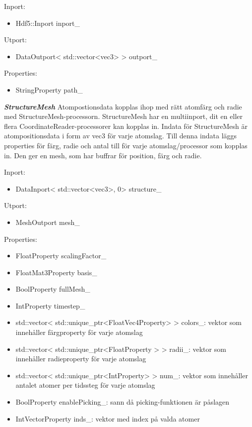 Inport:
\begin{itemize}
\item Hdf5::Inport inport\_
\end{itemize}

Utport:
\begin{itemize}
\item DataOutport< std::vector<vec3> > outport\_
\end{itemize}

Properties:
\begin{itemize}
\item StringProperty path\_
\end{itemize}

\textbf{\textit{StructureMesh}} \newline
Atompostionsdata kopplas ihop med rätt atomfärg och radie med StructureMesh-processorn. StructureMesh har en multiinport, dit en eller flera CoordinateReader-processorer kan kopplas in. Indata för StructureMesh är atompositionsdata i form av vec3 för varje atomslag. Till denna indata läggs properties för färg, radie och antal till för varje atomslag/processor som kopplas in. Den ger en mesh, som har buffrar för position, färg och radie.

Inport:
\begin{itemize}
\item DataInport< std::vector<vec3>, 0> structure\_
\end{itemize}

Utport:
\begin{itemize}
\item MeshOutport mesh\_
\end{itemize}

Properties:
\begin{itemize}
    \setlength\itemsep{0em}
    \item FloatProperty scalingFactor\_
    \item FloatMat3Property basis\_
    \item BoolProperty fullMesh\_
    \item IntProperty timestep\_
    \item std::vector< std::unique\_ptr<FloatVec4Property> > colors\_: vektor som innehåller färgproperty för varje atomslag
    \item std::vector< std::unique\_ptr<FloatProperty > > radii\_: vektor som innehåller radieproperty för varje atomslag
    \item std::vector< std::unique\_ptr<IntProperty> > num\_: vektor som innehåller antalet atomer per tidssteg för varje atomslag
    \item BoolProperty enablePicking\_: sann då picking-funktionen är påslagen 
    \item IntVectorProperty inds\_: vektor med index på valda atomer
\end{itemize}

